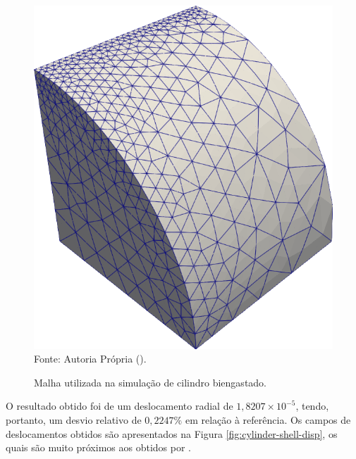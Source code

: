 \begin{figure}[h!]
    \centering
    \caption{Malha utilizada na simulação de cilindro biengastado.}
    \includegraphics[width=0.3\linewidth]{Figuras/cylinder-shell/mesh1.png}
    \\Fonte: Autoria Própria (\the\year).
    \label{fig:cylinder-shell-mesh}
\end{figure}

O resultado obtido foi de um deslocamento radial de $1,8207\times10^{-5}$, tendo, portanto, um desvio relativo de $0,2247\%$ em relação à referência. Os campos de deslocamentos obtidos são apresentados na Figura \ref{fig:cylinder-shell-disp}, os quais são muito próximos aos obtidos por .

